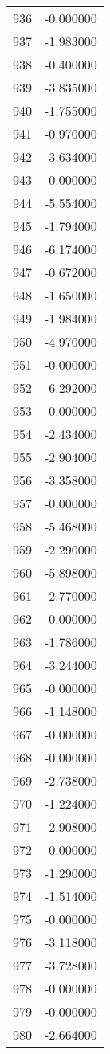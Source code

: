 \documentclass[12pt]{article}
\begin{document}
\begin{longtable}{@{}cc@{}}
936 & -0.000000 \\
937 & -1.983000 \\
938 & -0.400000 \\
939 & -3.835000 \\
940 & -1.755000 \\
941 & -0.970000 \\
942 & -3.634000 \\
943 & -0.000000 \\
944 & -5.554000 \\
945 & -1.794000 \\
946 & -6.174000 \\
947 & -0.672000 \\
948 & -1.650000 \\
949 & -1.984000 \\
950 & -4.970000 \\
951 & -0.000000 \\
952 & -6.292000 \\
953 & -0.000000 \\
954 & -2.434000 \\
955 & -2.904000 \\
956 & -3.358000 \\
957 & -0.000000 \\
958 & -5.468000 \\
959 & -2.290000 \\
960 & -5.898000 \\
961 & -2.770000 \\
962 & -0.000000 \\
963 & -1.786000 \\
964 & -3.244000 \\
965 & -0.000000 \\
966 & -1.148000 \\
967 & -0.000000 \\
968 & -0.000000 \\
969 & -2.738000 \\
970 & -1.224000 \\
971 & -2.908000 \\
972 & -0.000000 \\
973 & -1.290000 \\
974 & -1.514000 \\
975 & -0.000000 \\
976 & -3.118000 \\
977 & -3.728000 \\
978 & -0.000000 \\
979 & -0.000000 \\
980 & -2.664000 \\

\end{longtable}
\end{document}
